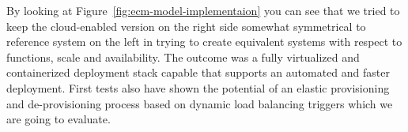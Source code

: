 \documentclass[EPiC]{easychair} %
\begin{document}
    By looking at Figure~\ref{fig:ecm-model-implementaion} you can see that we tried to keep the cloud-enabled version on the right side somewhat symmetrical to reference system on the left in trying to create equivalent systems with respect to functions, scale and availability. The outcome was a fully virtualized and containerized deployment stack capable that supports an automated and faster deployment. First tests also have shown the potential of an elastic provisioning and de-provisioning process based on dynamic load balancing triggers which we are going to evaluate. 
\end{document}
